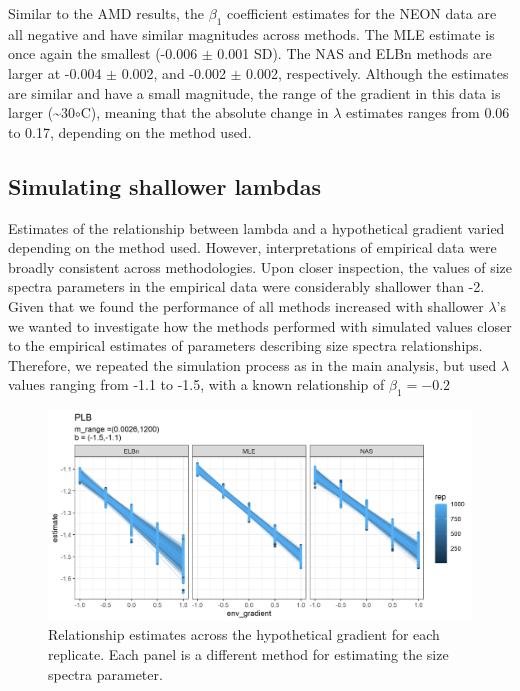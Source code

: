 \documentclass[
]{article}
\begin{document}
Similar to the AMD results, the \(\beta_1\) coefficient estimates for
the NEON data are all negative and have similar magnitudes across
methods. The MLE estimate is once again the smallest (-0.006 \(\pm\)
0.001 SD). The NAS and ELBn methods are larger at -0.004 \(\pm\) 0.002,
and -0.002 \(\pm\) 0.002, respectively. Although the estimates are
similar and have a small magnitude, the range of the gradient in this
data is larger (\textasciitilde30\(\circ\)C), meaning that the absolute
change in \(\lambda\) estimates ranges from 0.06 to 0.17, depending on
the method used.

\hypertarget{simulating-shallower-lambdas}{%
\subsection{Simulating shallower
lambdas}\label{simulating-shallower-lambdas}}

Estimates of the relationship between lambda and a hypothetical gradient
varied depending on the method used. However, interpretations of
empirical data were broadly consistent across methodologies. Upon closer
inspection, the values of size spectra parameters in the empirical data
were considerably shallower than -2. Given that we found the performance
of all methods increased with shallower \(\lambda\)'s we wanted to
investigate how the methods performed with simulated values closer to
the empirical estimates of parameters describing size spectra
relationships. Therefore, we repeated the simulation process as in the
main analysis, but used \(\lambda\) values ranging from -1.1 to -1.5,
with a known relationship of \(\beta_1 = -0.2\)

\newpage

\begin{figure}
\centering
\includegraphics{figures/shallow_lambda_main.png}
\caption{Relationship estimates across the hypothetical gradient for
each replicate. Each panel is a different method for estimating the size
spectra parameter.}
\end{figure}
\end{document}
